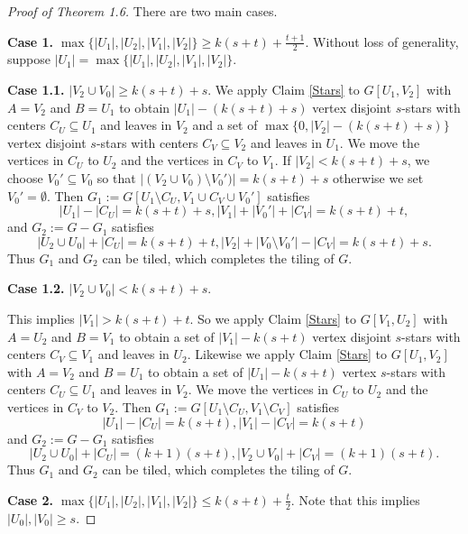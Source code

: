 \documentclass[oneside,12pt]{memoir}
\begin{document}
\begin{proof}[Proof of Theorem 1.6]
There are two main cases.

\noindent
\textbf{Case 1.} $\max\{|U_1|,|U_2|,|V_1|,|V_2|\}\geq k(s+t)+\frac{t+1}{2}$.  Without loss of generality, suppose $|U_1|=\max\{|U_1|,|U_2|,|V_1|,|V_2|\}$. 

\textbf{Case 1.1.} $|V_2\cup V_0|\geq k(s+t)+s$.  We apply Claim \ref{Stars} to $G[U_1, V_2]$ with $A=V_2$ and $B=U_1$ to obtain $|U_1|-(k(s+t)+s)$ vertex disjoint $s$-stars with centers $C_U\subseteq U_1$ and leaves in $V_2$ and a set of $\max\{0, |V_2|-(k(s+t)+s)\}$ vertex disjoint $s$-stars with centers $C_V\subseteq V_2$ and leaves in $U_1$.  We move the vertices in $C_U$ to $U_2$ and the vertices in $C_V$ to $V_1$.  If $|V_2|<k(s+t)+s$, we choose $V_0'\subseteq V_0$ so that $|(V_2\cup V_0)\setminus V_0')|=k(s+t)+s$ otherwise we set $V_0'=\emptyset$. Then $G_1:=G[U_1\setminus C_U, V_1\cup C_V\cup V_0']$ satisfies $$|U_1|-|C_U|=k(s+t)+s, |V_1|+|V_0'|+|C_V|=k(s+t)+t,$$ and $G_2:=G-G_1$ satisfies $$|U_2\cup U_0|+|C_U|=k(s+t)+t, |V_2|+|V_0\setminus V_0'|-|C_V|=k(s+t)+s.$$  Thus $G_1$ and $G_2$ can be tiled, which completes the tiling of $G$.

\textbf{Case 1.2.} $|V_2\cup V_0|<k(s+t)+s$.  

This implies $|V_1|> k(s+t)+t$.  So we apply Claim \ref{Stars} to $G[V_1,U_2]$ with $A=U_2$ and $B=V_1$ to obtain a set of $|V_1|-k(s+t)$ vertex disjoint $s$-stars with centers $C_V\subseteq V_1$ and leaves in $U_2$. Likewise we apply Claim \ref{Stars} to $G[U_1,V_2]$ with $A=V_2$ and $B=U_1$ to obtain a set of $|U_1|-k(s+t)$ vertex $s$-stars with centers $C_U\subseteq U_1$ and leaves in $V_2$.  We move the vertices in $C_U$ to $U_2$ and the vertices in $C_V$ to $V_2$.  Then $G_1:=G[U_1\setminus C_U, V_1\setminus C_V]$ satisfies $$|U_1|-|C_U|=k(s+t), |V_1|-|C_V|=k(s+t)$$ and $G_2:=G-G_1$ satisfies $$|U_2\cup U_0|+|C_U|=(k+1)(s+t), |V_2\cup V_0|+|C_V|=(k+1)(s+t).$$  Thus $G_1$ and $G_2$ can be tiled, which completes the tiling of $G$.


\noindent
\textbf{Case 2.} $\max\{|U_1|,|U_2|,|V_1|,|V_2|\}\leq k(s+t)+\frac{t}{2}$. Note that this implies $|U_0|, |V_0|\geq s$. 


\end{proof}
\end{document}
